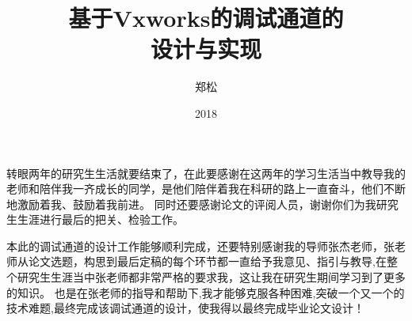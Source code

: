 \documentclass[format=draft,language=chinese,degree=master]{hustthesis}
\title{基于Vxworks的调试通道的\\
设计与实现}{A design and implementation of debug channel based on Vxworks.}
\author{郑松}{Song Zheng}
\date{2018}{5}{27}
\begin{document}
\frontmatter

\maketitle


\makeabstract

\tableofcontents


\mainmatter

\clearpage


\clearpage


\clearpage


\clearpage


\clearpage


\clearpage

\backmatter

\begin{ack}
\indent 转眼两年的研究生生活就要结束了，在此要感谢在这两年的学习生活当中教导我的老师和陪伴我一齐成长的同学，是他们陪伴着我在科研的路上一直奋斗，他们不断地激励着我、鼓励着我前进。
同时还要感谢论文的评阅人员，谢谢你们为我研究生生涯进行最后的把关、检验工作。


\noindent 本此的调试通道的设计工作能够顺利完成，还要特别感谢我的导师张杰老师，张老师从论文选题，构思到最后定稿的每个环节都一直给予我意见、指引与教导,在整个研究生生涯当中张老师都非常严格的要求我，这让我在研究生期间学习到了更多的知识。
也是在张老师的指导和帮助下,我才能够克服各种困难,突破一个又一个的技术难题,最终完成该调试通道的设计，使我得以最终完成毕业论文设计！
\end{ack}

\nocite{*}
% 

\end{document}
